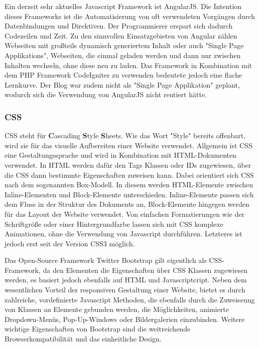       Ein derzeit sehr aktuelles Javascript Framework ist {AngularJS\cite{angular}}. Die Intention dieses Frameworks ist die Automatisierung von oft verwendeten Vorgängen durch
      Datenbindungen und Direktiven. Der Programmierer erspart sich dadurch Codezeilen und Zeit. Zu den sinnvollen Einsatzgebieten von Angular zählen Webseiten mit großteils dynamisch generiertem
      Inhalt oder auch "Single Page Applikations", Webseiten, die einmal geladen werden und dann nur zwischen Inhalten wechseln, ohne diese neu zu laden. Das Framework in Kombination mit dem PHP
      Framework CodeIgniter zu verwenden bedeutete jedoch eine flache Lernkurve. Der Blog war zudem nicht als "Single Page Applikation" geplant, wodurch sich die Verwendung von AngularJS nicht rentiert hätte.

      \subsubsection*{CSS}
      {CSS\cite{css}} steht für \textbf{C}ascading \textbf{S}tyle \textbf{S}heets. Wie das Wort "Style" bereits offenbart, wird sie für das visuelle Aufbereiten einer Website verwendet.
      Allgemein ist CSS eine Gestaltungssprache und wird in Kombination mit HTML-Dokumenten verwendet. In HTML werden dafür den Tags Klassen oder IDs
      zugewiesen, über die CSS dann bestimmte Eigenschaften zuweisen kann. Dabei orientiert sich CSS nach dem sogenannten Box-Modell. In diesem werden HTML-Elemente
      zwischen Inline-Elementen und Block-Elemente unterschieden. Inline-Elemente passen sich dem Fluss in der Struktur des Dokuments an, Block-Elemente hingegen
      werden für das Layout der Website verwendet. Von einfachen Formatierungen wie der Schriftgröße oder einer Hintergrundfarbe lassen sich mit CSS komplexe Animationen,
      ohne die Verwendung von Javascript durchführen. Letzteres ist jedoch erst seit der Version CSS3 möglich.

      Das Open-Source Framework {Twitter Bootstrap\cite{bootstrap}} gilt eigentlich als CSS-Framework, da den Elementen die Eigenschaften über CSS Klassen zugewiesen werden, es basiert jedoch
      ebenfalls auf HTML und Javascriptcript. Neben dem wesentlichen Vorteil der responsiven Gestaltung einer Website, bietet es durch
      zahlreiche, vordefinierte Javascript Methoden, die ebenfalls durch die Zuweiseung von Klassen an Elemente gebunden werden, die Möglichkeiten, animierte Dropdown-Menüs, Pop-Up-Windows oder Bildergalerien einzubinden.
      Weitere wichtige Eigenschaften von Bootstrap sind die weitreichende Browserkompatibilität und das einheitliche Design.

